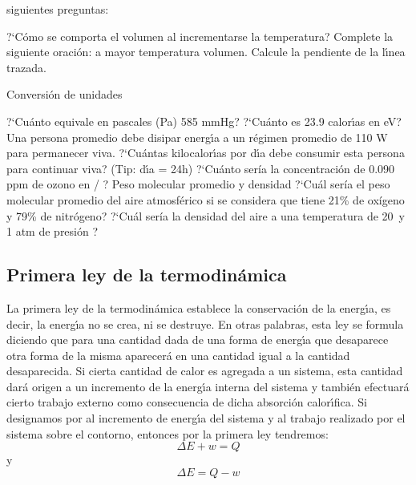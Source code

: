 \begin{exercises}
siguientes preguntas:

\subexer ?`C\'omo se comporta  el volumen al incrementarse la
temperatura?
\subexer Complete la siguiente oraci\'on: a mayor temperatura \hrulefill
\hskip 1mm volumen.
\subexer Calcule la pendiente de la l\'{\i}nea trazada.


\exer Conversi\'on de unidades

\subexer  ?`Cu\'anto equivale en pascales (Pa) 585 mmHg?
\subexer ?`Cu\'anto es 23.9 calor\'{\i}as en eV?
\subexer Una persona promedio debe disipar energ\'{\i}a a un
r\'egimen promedio de 110 W para permanecer viva.  ?`Cu\'antas kilocalor\'{\i}as por d\'{\i}a debe consumir
esta persona para continuar viva? (Tip: d\'{\i}a = 24h) 
\subexer  ?`Cu\'anto sería la concentración de 0.090 ppm de ozono en \milli\gram / \cubic\metre ?
\exer Peso molecular promedio y densidad
\subexer ?`Cu\'al sería el peso molecular promedio del aire atmosférico si se considera que tiene 21\% de oxígeno y 79\% de nitrógeno? 
\subexer ?`Cu\'al sería la densidad del aire a una temperatura de 20\celsius\, y 1 atm de presión ? 
\end{exercises}

\subsection{Primera ley de la termodin\'amica}
La primera ley de la termodin\'amica establece la conservaci\'on de la
energ\'{\i}a, es decir, la energ\'{\i}a no se crea, ni se destruye. En otras
palabras, esta ley se formula diciendo que para una cantidad dada de
una forma de e\-nerg\'{\i}a que desaparece otra forma de la misma
aparecer\'a en una cantidad igual a la cantidad desaparecida.
Si cierta cantidad de calor  es agregada a un sistema, esta cantidad dar\'a origen a un incremento de la energ\'{\i}a interna del sistema
y tambi\'en efectuar\'a cierto trabajo externo como consecuencia de dicha absorci\'on calor\'{\i}fica. Si designamos por  al incremento de
energ\'{\i}a del sistema y  al trabajo realizado por el sistema sobre el contorno, entonces por la primera ley tendremos:
\begin{equation}
\Delta E + w = Q
\end{equation}
y
\begin{equation}
\Delta E = Q - w
\end{equation}
